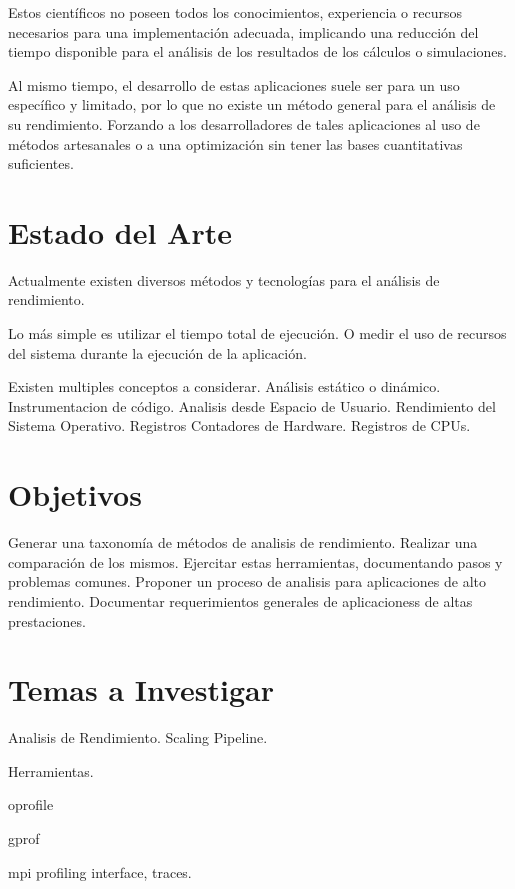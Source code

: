 \documentclass[a4paper,twocolumn]{article}
\begin{document}
Estos cient\'ificos no poseen todos los conocimientos, experiencia o recursos
necesarios para una implementaci\'on adecuada, implicando una reducci\'on del
tiempo disponible para el an\'alisis de los resultados de los c\'alculos o
simulaciones.

Al mismo tiempo, el desarrollo de estas aplicaciones suele ser para un uso
espec\'ifico y limitado, por lo que no existe un m\'etodo general para el
an\'alisis de su rendimiento. Forzando a los desarrolladores de tales aplicaciones
al uso de m\'etodos artesanales o a una optimizaci\'on sin tener las bases
cuantitativas suficientes.

\section{Estado del Arte}

Actualmente existen diversos m\'etodos y tecnolog\'ias para el an\'alisis de
rendimiento.

Lo m\'as simple es utilizar el tiempo total de ejecuci\'on. O medir el uso de
recursos del sistema durante la ejecuci\'on de la aplicaci\'on.

Existen multiples conceptos a considerar.
An\'alisis est\'atico o din\'amico.
Instrumentacion de c\'odigo.
Analisis desde Espacio de Usuario.
Rendimiento del Sistema Operativo.
Registros Contadores de Hardware. Registros de CPUs.

\section{Objetivos}

Generar una taxonom\'ia de m\'etodos de analisis de rendimiento.
Realizar una comparaci\'on de los mismos.
Ejercitar estas herramientas, documentando pasos y problemas comunes.
Proponer un proceso de analisis para aplicaciones de alto rendimiento.
Documentar requerimientos generales de aplicacioness de altas prestaciones.

\section{Temas a Investigar}

Analisis de Rendimiento.
Scaling
Pipeline.

Herramientas.

oprofile \cite{oprofile}

gprof \cite{gprof}

mpi profiling interface, traces. \cite{mpi}
\end{document}
